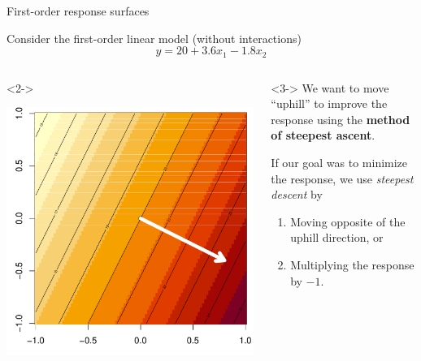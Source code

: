 \documentclass[10pt]{beamer}\usepackage[]{graphicx}\usepackage[]{color}
\newenvironment{knitrout}{}{} %
\begin{document}
\begin{frame}[fragile]{First-order response surfaces}

Consider the first-order linear model (without interactions)
\[ y = 20 + 3.6x_1 - 1.8x_2 \]

\begin{columns}

\begin{column}{0.5\textwidth}<2->
\begin{knitrout}
\color{fgcolor}

{\centering \includegraphics[width=\textwidth]{figure/unnamed-chunk-1-1} 

}



\end{knitrout}

\end{column}

\begin{column}{0.5\textwidth}<3->
We want to move ``uphill'' to improve the response using the \textbf{method of steepest ascent}.

\bigskip
If our goal was to minimize the response, we use \emph{steepest descent} by
\begin{enumerate}
  \item Moving opposite of the uphill direction, or
  \item Multiplying the response by $-1$.
\end{enumerate}
\end{column}

\end{columns}

\end{frame}
\end{document}

